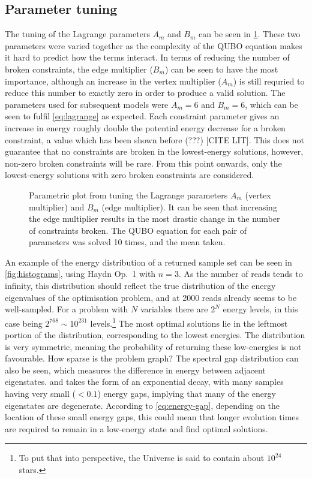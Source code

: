 \documentclass[12pt]{article}
\theoremstyle{definition}
\begin{document}
\subsection{Parameter tuning}

The tuning of the Lagrange parameters $A_m$ and $B_m$ can be seen in \cref{fig:lagrange}. These two parameters were varied together as the complexity of the QUBO equation makes it hard to predict how the terms interact. In terms of reducing the number of broken constraints, the edge multiplier ($B_m$) can be seen to have the most importance, although an increase in the vertex multiplier ($A_m$) is still requried to reduce this number to exactly zero in order to produce a valid solution. The parameters used for subsequent models were $A_m=6$ and $B_m=6$, which can be seen to fulfil \cref{eq:lagrange} as expected. Each constraint parameter gives an increase in energy roughly double the potential energy decrease for a broken constraint, a value which has been shown before (???) [CITE LIT]. This does not guarantee that no constraints are broken in the lowest-energy solutions, however, non-zero broken constraints will be rare. From this point onwards, only the lowest-energy solutions with zero broken constraints are considered.

\begin{figure}
    \centering
    \small
    
    \caption{Parametric plot from tuning the Lagrange parameters $A_m$ (vertex multiplier) and $B_m$ (edge multiplier). It can be seen that increasing the edge multiplier results in the most drastic change in the number of constraints broken. The QUBO equation for each pair of parameters was solved 10 times, and the mean taken.}
    \label{fig:lagrange}
\end{figure}

An example of the energy distribution of a returned sample set can be seen in \cref{fig:histograms}, using Haydn Op.\ 1 with $n=3$. As the number of reads tends to infinity, this distribution should reflect the true distribution of the energy eigenvalues of the optimisation problem, and at \num{2000} reads already seems to be well-sampled. For a problem with $N$ variables there are $2^N$ energy levels, in this case being $2^{768}\sim 10^{231}$ levels.\footnote{To put that into perspective, the Universe is said to contain about $10^{24}$ stars.} The most optimal solutions lie in the leftmost portion of the distribution, corresponding to the lowest energies. The distribution is very symmetric, meaning the probability of returning these low-energies is not favourable. How sparse is the problem graph?
The spectral gap distribution can also be seen, which measures the difference in energy between adjacent eigenstates. and takes the form of an exponential decay, with many samples having very small ($<0.1$) energy gaps, implying that many of the energy eigenstates are degenerate. According to \cref{eq:energy-gap}, depending on the location of these small energy gaps, this could mean that longer evolution times are required to remain in a low-energy state and find optimal solutions.
\end{document}
